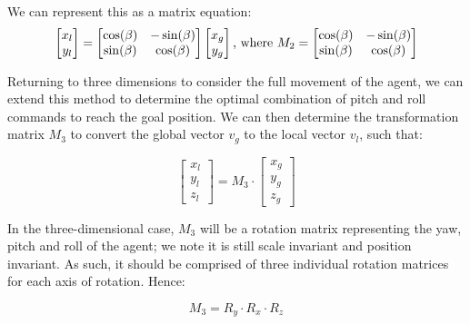 \documentclass[12pt]{article}
\begin{document}
We can represent this as a matrix equation:
\begin{equation}
    \begin{bmatrix}
    x_l \\
    y_l
    \end{bmatrix}
    = 
    \begin{bmatrix}
    \cos(\beta) & -\sin(\beta) \\
    \sin(\beta) & \cos(\beta)
    \end{bmatrix}
    \begin{bmatrix}
    x_g \\
    y_g
    \end{bmatrix}
    \\ \text{, where } \\
    M_2 = 
    \begin{bmatrix}
    \cos(\beta) & -\sin(\beta) \\
    \sin(\beta) & \cos(\beta)
    \end{bmatrix}
\end{equation}

Returning to three dimensions to consider the full movement of the agent, we can extend this method to determine the optimal combination of pitch and roll commands to reach the goal position. We can then determine the transformation matrix $M_3$ to convert the global vector $v_g$ to the local vector $v_l$, such that:

\begin{equation}
   \begin{bmatrix}
    x_l \\
    y_l \\
    z_l
    \end{bmatrix}
    = M_3 \cdot
    \begin{bmatrix}
    x_g \\
    y_g \\
    z_g
    \end{bmatrix}
\label{eq:basis-transformation}
\end{equation}

In the three-dimensional case, $M_3$ will be a rotation matrix representing the yaw, pitch and roll of the agent; we note it is still scale invariant and position invariant. As such, it should be comprised of three individual rotation matrices for each axis of rotation. Hence:

\begin{equation}
    M_3 = R_y \cdot R_x \cdot R_z
\end{equation}
\end{document}
